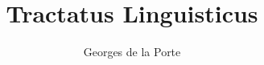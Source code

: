 \documentclass{scrbook}
\author{Georges de la Porte}
\title{Tractatus Linguisticus}
\begin{document}
 
 
  
\maketitle                
\frontmatter 

{\sloppy\tableofcontents}


 
\mainmatter     
 
 
 
 
 
 
 
 
 
 
 
 
 
 
   
\sloppy
\printbibliography
\end{document}
